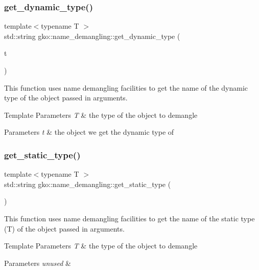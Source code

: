 \subsubsection{\texorpdfstring{get\+\_\+dynamic\+\_\+type()}{get\_dynamic\_type()}}
{\footnotesize\ttfamily template$<$typename T $>$ \\
std\+::string gko\+::name\+\_\+demangling\+::get\+\_\+dynamic\+\_\+type (\begin{DoxyParamCaption}\item[{const T \&}]{t }\end{DoxyParamCaption})}



This function uses name demangling facilities to get the name of the dynamic type of the object passed in arguments. 


\begin{DoxyTemplParams}{Template Parameters}
{\em T} & the type of the object to demangle\\
\hline
\end{DoxyTemplParams}

\begin{DoxyParams}{Parameters}
{\em t} & the object we get the dynamic type of \\
\hline
\end{DoxyParams}
\mbox{\label{namespacegko_1_1name__demangling_a305c6bc422a3babdd1179db5b2859ae3}} 
\subsubsection{\texorpdfstring{get\+\_\+static\+\_\+type()}{get\_static\_type()}}
{\footnotesize\ttfamily template$<$typename T $>$ \\
std\+::string gko\+::name\+\_\+demangling\+::get\+\_\+static\+\_\+type (\begin{DoxyParamCaption}\item[{const T \&}]{ }\end{DoxyParamCaption})}



This function uses name demangling facilities to get the name of the static type ({\ttfamily T}) of the object passed in arguments. 


\begin{DoxyTemplParams}{Template Parameters}
{\em T} & the type of the object to demangle\\
\hline
\end{DoxyTemplParams}

\begin{DoxyParams}{Parameters}
{\em unused} & \\
\hline
\end{DoxyParams}
